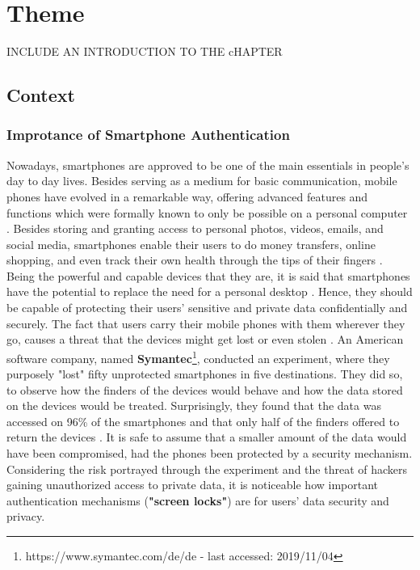 
\chapter{Theme}\label{ch:second}

INCLUDE AN INTRODUCTION TO THE cHAPTER

\section{Context}

\subsection{Improtance of Smartphone Authentication}

Nowadays, smartphones are approved to be one of the main essentials in people's day to day lives. Besides serving as a medium for basic communication, mobile phones have evolved in a remarkable way, offering advanced features and functions which were formally known to only be possible on a personal computer \cite{Alsaleh}. Besides storing and granting access to personal photos, videos, emails, and social media, smartphones enable their users to do money transfers, online shopping, and even track their own health through the tips of their fingers \cite{Egelman:2014:YRL:2660267.2660273,Albayram:2017:BUL:3235924.3235929,Schloeglhofer}. \\

Being the powerful and capable devices that they are, it is said that smartphones have the potential to replace the need for a personal desktop \cite{Alsaleh}. Hence, they should be capable of protecting their users' sensitive and private data confidentially and securely. The fact that users carry their mobile phones with them wherever they go, causes a threat that the devices might get  lost or even stolen \cite{Egelman:2014:YRL:2660267.2660273}. An American software company, named \textbf{Symantec}\footnote{https://www.symantec.com/de/de - last accessed: 2019/11/04}, conducted an experiment, where they purposely "lost" fifty unprotected smartphones in five destinations. They did so, to observe how the finders of the devices would behave and how the data stored on the devices would be treated. Surprisingly, they found that the data was accessed on 96\% of the smartphones and that only half of the finders offered to return the devices \cite{symantec}. It is safe to assume that a smaller amount of the data would have been compromised, had the phones been protected by a security mechanism. Considering the risk portrayed through the experiment and the threat of hackers gaining unauthorized access to private data, it is noticeable how important authentication mechanisms (\textbf{"screen locks"}) are for users' data security and privacy.\\

